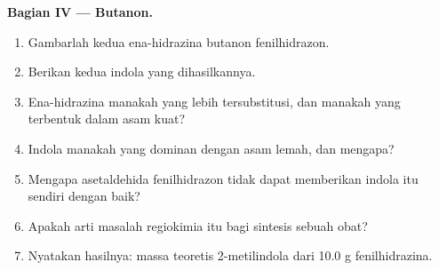 \begin{problem}
\medskip\noindent\textbf{Bagian IV --- Butanon.}
\begin{enumerate}[resume, beginpenalty=10000]
  \item Gambarlah kedua ena-hidrazina butanon fenilhidrazon.
  \item Berikan kedua indola yang dihasilkannya.
  \item Ena-hidrazina manakah yang lebih tersubstitusi, dan manakah yang terbentuk dalam asam kuat?
  \item Indola manakah yang dominan dengan asam lemah, dan mengapa?
  \item Mengapa asetaldehida fenilhidrazon tidak dapat memberikan indola itu sendiri dengan baik?
  \item Apakah arti masalah regiokimia itu bagi sintesis sebuah obat?
  \item Nyatakan hasilnya: massa teoretis 2-metilindola dari 10.0 g
        fenilhidrazina.
\end{enumerate}
\end{problem}
